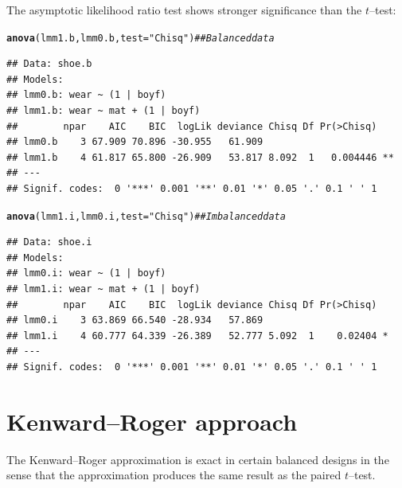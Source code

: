 \documentclass[11pt]{article}\usepackage[]{graphicx}\usepackage[]{xcolor}
\makeatletter
\newcommand{\hlstr}[1]{\textcolor[rgb]{0.192,0.494,0.8}{#1}}%
\newcommand{\hlcom}[1]{\textcolor[rgb]{0.678,0.584,0.686}{\textit{#1}}}%
\newcommand{\hlstd}[1]{\textcolor[rgb]{0.345,0.345,0.345}{#1}}%
\newcommand{\hlkwc}[1]{\textcolor[rgb]{0.333,0.667,0.333}{#1}}%
\newcommand{\hlkwd}[1]{\textcolor[rgb]{0.737,0.353,0.396}{\textbf{#1}}}%
\newenvironment{kframe}{%
 \def\at@end@of@kframe{}%
 \ifinner\ifhmode%
  \def\at@end@of@kframe{\end{minipage}}%
  \begin{minipage}{\columnwidth}%
 \fi\fi%
 \def\FrameCommand##1{\hskip\@totalleftmargin \hskip-\fboxsep
 \colorbox{shadecolor}{##1}\hskip-\fboxsep
     \hskip-\linewidth \hskip-\@totalleftmargin \hskip\columnwidth}%
 \MakeFramed {\advance\hsize-\width
   \@totalleftmargin\z@ \linewidth\hsize
   \@setminipage}}%
 {\par\unskip\endMakeFramed%
 \at@end@of@kframe}
\newenvironment{knitrout}{}{} %
\makeatother
\begin{document}
The asymptotic likelihood ratio test shows stronger significance than
the $t$--test:

\begin{knitrout}
\color{fgcolor}\begin{kframe}
\begin{alltt}
\hlkwd{anova}\hlstd{(lmm1.b, lmm0.b,} \hlkwc{test}\hlstd{=}\hlstr{"Chisq"}\hlstd{)} \hlcom{## Balanced data}
\end{alltt}


{\ttfamily\noindent\itshape\color{messagecolor}{\#\# refitting model(s) with ML (instead of REML)}}\begin{verbatim}
## Data: shoe.b
## Models:
## lmm0.b: wear ~ (1 | boyf)
## lmm1.b: wear ~ mat + (1 | boyf)
##        npar    AIC    BIC  logLik deviance Chisq Df Pr(>Chisq)   
## lmm0.b    3 67.909 70.896 -30.955   61.909                       
## lmm1.b    4 61.817 65.800 -26.909   53.817 8.092  1   0.004446 **
## ---
## Signif. codes:  0 '***' 0.001 '**' 0.01 '*' 0.05 '.' 0.1 ' ' 1
\end{verbatim}
\begin{alltt}
\hlkwd{anova}\hlstd{(lmm1.i, lmm0.i,} \hlkwc{test}\hlstd{=}\hlstr{"Chisq"}\hlstd{)} \hlcom{## Imbalanced data}
\end{alltt}


{\ttfamily\noindent\itshape\color{messagecolor}{\#\# refitting model(s) with ML (instead of REML)}}\begin{verbatim}
## Data: shoe.i
## Models:
## lmm0.i: wear ~ (1 | boyf)
## lmm1.i: wear ~ mat + (1 | boyf)
##        npar    AIC    BIC  logLik deviance Chisq Df Pr(>Chisq)  
## lmm0.i    3 63.869 66.540 -28.934   57.869                      
## lmm1.i    4 60.777 64.339 -26.389   52.777 5.092  1    0.02404 *
## ---
## Signif. codes:  0 '***' 0.001 '**' 0.01 '*' 0.05 '.' 0.1 ' ' 1
\end{verbatim}
\end{kframe}
\end{knitrout}

\section{Kenward--Roger approach}
\label{sec:kenw-roger-appr}

The Kenward--Roger approximation is exact in certain balanced designs in the
sense that the approximation produces the same result as the paired $t$--test.
\end{document}
